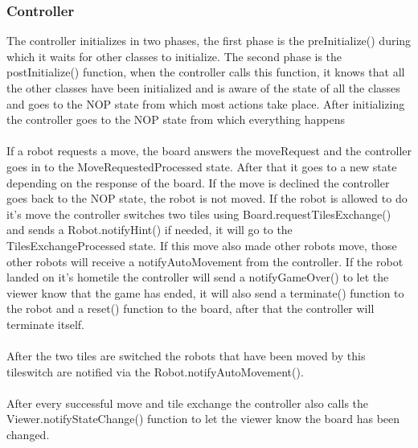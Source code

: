 	\subsubsection{Controller}
	The controller initializes in two phases, the first phase is the preInitialize() during which it waits for other classes to initialize. The second phase is the postInitialize() function, when the controller calls this function, it knows that all the other classes have been initialized and is aware of the state of all the classes and goes to the NOP state from which most actions take place. After initializing the controller goes to the NOP state from which everything happens\\
\\
If a robot requests a move, the board answers the moveRequest and the controller goes in to the MoveRequestedProcessed state. After that it goes to a new state depending on the response of the board. If the move is declined the controller goes back to the NOP state, the robot is not moved. If the robot is allowed to do it's move the controller switches two tiles using Board.requestTilesExchange() and sends a Robot.notifyHint() if needed, it will go to the TilesExchangeProcessed state. If this move also made other robots move, those other robots will receive a notifyAutoMovement from the controller. If the robot landed on it's hometile the controller will send a notifyGameOver() to let the viewer know that the game has ended, it will also send a terminate() function to the robot and a reset() function to the board, after that the controller will terminate itself.\\
\\
After the two tiles are switched the robots that have been moved by this tileswitch are notified via the Robot.notifyAutoMovement().\\
\\
After every successful move and tile exchange the controller also calls the Viewer.notifyStateChange() function to let the viewer know the board has been changed.\\
